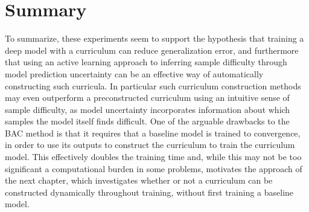 \section{Summary}
To summarize, these experiments seem to support the hypothesis that training a deep model with a curriculum can reduce generalization error, and furthermore that using an active learning approach to inferring sample difficulty through model prediction uncertainty can be an effective way of automatically constructing such curricula. In particular such curriculum construction methods may even outperform a preconstructed curriculum using an intuitive sense of sample difficulty, as model uncertainty incorporates information about which samples the model itself finds difficult. One of the arguable drawbacks to the BAC method is that it requires that a baseline model is trained to convergence, in order to use its outputs to construct the curriculum to train the curriculum model. This effectively doubles the training time and, while this may not be too significant a computational burden in some problems, motivates the approach of the next chapter, which investigates whether or not a curriculum can be constructed dynamically throughout training, without first training a baseline model.



